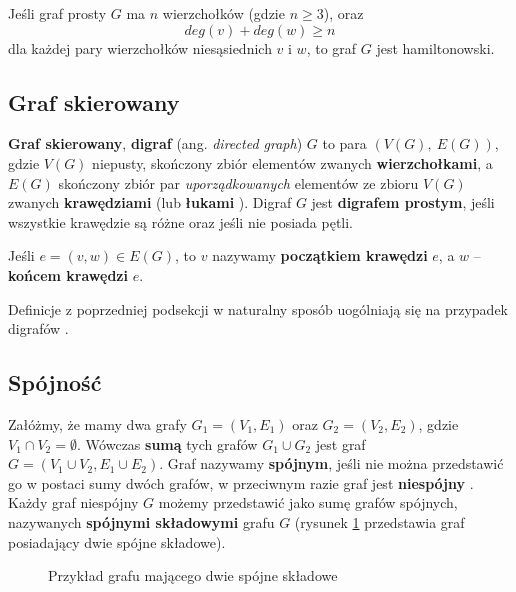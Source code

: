 \begin{theorem}[Orego, 1960]\label{theorem:orego}
Jeśli graf prosty $G$ ma $n$ wierzchołków (gdzie $n\geq 3$), oraz
\[
deg(v) + deg(w) \geq n
\]
dla każdej pary wierzchołków niesąsiednich $v$ i $w$, to graf $G$ jest hamiltonowski.
\end{theorem}


\subsection*{Graf skierowany}

\textbf{Graf skierowany}, \textbf{digraf} (ang. \textit{directed graph}) $G$ to para $(V(G),\ E(G))$, gdzie $V(G)$ niepusty, skończony zbiór elementów zwanych \textbf{wierzchołkami}, a $E(G)$ skończony zbiór par \emph{uporządkowanych} elementów ze zbioru $V(G)$ zwanych \textbf{krawędziami} (lub \textbf{łukami} \cite[135]{wilson}). Digraf $G$ jest \textbf{digrafem prostym}, jeśli wszystkie krawędzie są różne oraz jeśli nie posiada pętli. 

Jeśli $e = (v,w) \in E(G)$, to $v$ nazywamy \textbf{początkiem krawędzi} $e$, a $w$ -- \textbf{końcem krawędzi} $e$.

Definicje z poprzedniej podsekcji w naturalny sposób uogólniają się na przypadek digrafów \cite[136]{wilson}. 


\subsection*{Spójność}

Załóżmy, że mamy dwa grafy $G_1 = (V_1,E_1)$ oraz $G_2 = (V_2,E_2)$, gdzie $V_1 \cap V_2 = \emptyset$. Wówczas \textbf{sumą} tych grafów $G_1 \cup G_2$ jest graf $G=(V_1\cup V_2, E_1\cup E_2)$. Graf nazywamy \textbf{spójnym}, jeśli nie można przedstawić go w postaci sumy dwóch grafów, w przeciwnym razie graf jest \textbf{niespójny} \cite[22]{wilson}. Każdy graf niespójny $G$ możemy przedstawić jako sumę grafów spójnych, nazywanych \textbf{spójnymi składowymi} grafu $G$ (rysunek \ref{fig:connected-copoments-example} przedstawia graf posiadający dwie spójne składowe). 

\begin{figure}[h]
\centering
{}
\caption{Przykład grafu mającego dwie spójne składowe} \label{fig:connected-copoments-example}
\end{figure}

